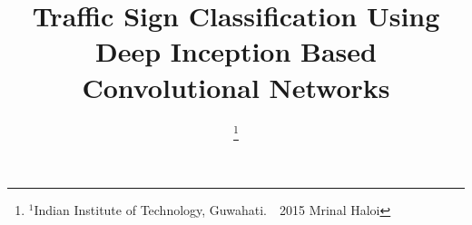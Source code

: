 \documentclass[conference]{IEEEtran}
\begin{document}
%
\title{Traffic Sign Classification Using Deep Inception Based Convolutional Networks}

\author{
\thanks{$ ^1$Indian Institute of Technology, Guwahati.\
\textcopyright~2015 Mrinal Haloi}
}


% 








\maketitle
\end{document}
